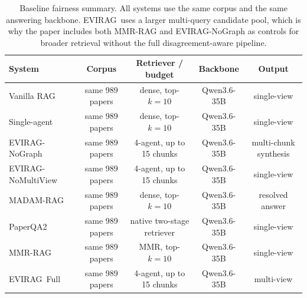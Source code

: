 \documentclass[11pt]{article}
\newcommand{\system}{\textsc{EVIRAG}\xspace}
\begin{document}
\begin{table}[t]
\centering\small
\setlength{\tabcolsep}{5pt}
\begin{tabular}{@{}lcccc@{}}
\toprule
\textbf{System} & \textbf{Corpus} & \textbf{Retriever / budget} & \textbf{Backbone} & \textbf{Output} \\
\midrule
Vanilla RAG & same 989 papers & dense, top-$k{=}10$ & Qwen3.6-35B & single-view \\
Single-agent & same 989 papers & dense, top-$k{=}10$ & Qwen3.6-35B & single-view \\
\system-NoGraph & same 989 papers & 4-agent, up to 15 chunks & Qwen3.6-35B & multi-chunk synthesis \\
\system-NoMultiView & same 989 papers & 4-agent, up to 15 chunks & Qwen3.6-35B & single-view \\
MADAM-RAG & same 989 papers & dense, top-$k{=}10$ & Qwen3.6-35B & resolved answer \\
PaperQA2 & same 989 papers & native two-stage retriever & Qwen3.6-35B & single-view \\
MMR-RAG & same 989 papers & MMR, top-$k{=}10$ & Qwen3.6-35B & single-view \\
\system\ Full & same 989 papers & 4-agent, up to 15 chunks & Qwen3.6-35B & multi-view \\
\bottomrule
\end{tabular}
\caption{Baseline fairness summary.  All systems use the same corpus and the
same answering backbone.  \system\ uses a larger multi-query candidate pool,
which is why the paper includes both MMR-RAG and \system-NoGraph as controls
for broader retrieval without the full disagreement-aware pipeline.}
\label{tab:fairness}
\end{table}
\end{document}
